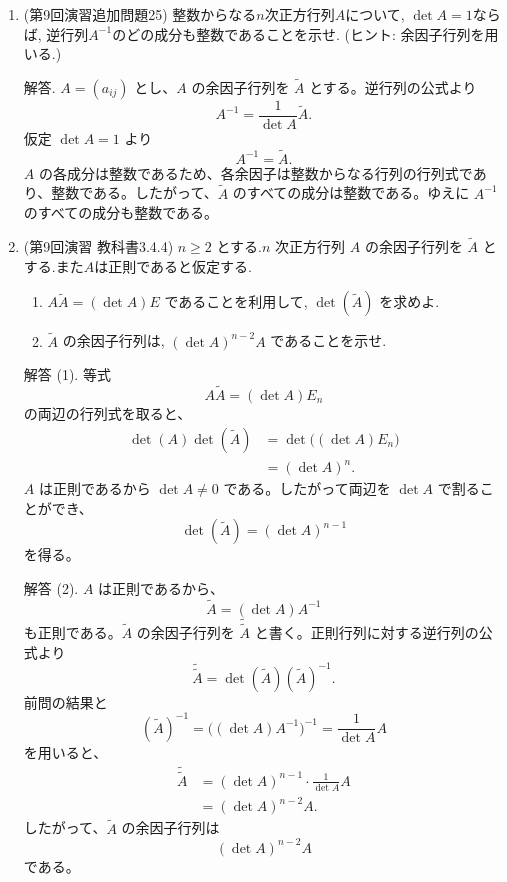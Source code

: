 \documentclass[dvipdfmx,a4paper,11pt]{article} %
\theoremstyle{definition}
\begin{document}
\begin{enumerate}[label=\textbf{問題}\arabic*.]
$n=1$ のとき、
\[
D_1(a_0,a_1)
=\begin{vmatrix}a_0&-1\\a_1&x\end{vmatrix}
=a_0x+a_1
\]
であり、主張は成り立つ。

帰納法の仮定として
\[
D_{n-1}(a_1,\ldots,a_n)
=a_1x^{n-1}+a_2x^{n-2}+\cdots+a_{n-1}x+a_n
\]
とする。このとき
\begin{align*}
D_n(a_0,\ldots,a_n)
&=a_0x^n+D_{n-1}(a_1,\ldots,a_n)\\
&=a_0x^n+a_1x^{n-1}+\cdots+a_{n-1}x+a_n.
\end{align*}
よって数学的帰納法により
\[
\boxed{
D_n(a_0,\ldots,a_n)
=a_0x^n+a_1x^{n-1}+\cdots+a_{n-1}x+a_n}
\]
が成り立つ。

 \item (第9回演習追加問題25)  整数からなる$n$次正方行列$A$について, $\det A=1$ならば, 逆行列$A^{-1}$のどの成分も整数であることを示せ. (ヒント: 余因子行列を用いる.)

解答. $A=(a_{ij})$ とし、$A$ の余因子行列を $\widetilde A$ とする。逆行列の公式より
\[
A^{-1}=\frac{1}{\det A}\widetilde A.
\]
仮定 $\det A=1$ より
\[
A^{-1}=\widetilde A.
\]
$A$ の各成分は整数であるため、各余因子は整数からなる行列の行列式であり、整数である。したがって、$\widetilde A$ のすべての成分は整数である。ゆえに $A^{-1}$ のすべての成分も整数である。

\item (第9回演習 教科書3.4.4) $n\geq 2$ とする.$n$ 次正方行列 $A$ の余因子行列を $\widetilde A$ とする.また$A$は正則であると仮定する. 
 \begin{enumerate}[label=(\arabic*)]
\item
\(
A\widetilde A=(\det A)E
\)
であることを利用して, 
\(
\det (\widetilde A)
\)
を求めよ.

\item $\widetilde A$ の余因子行列は, 
\(
(\det A)^{n-2}A
\)
であることを示せ.
\end{enumerate}

解答 (1). 
等式
\[
A\widetilde A=(\det A)E_n
\]
の両辺の行列式を取ると、
\begin{align*}
\det(A)\det(\widetilde A)
&=\det\bigl((\det A)E_n\bigr)\\
&=(\det A)^n.
\end{align*}
$A$ は正則であるから $\det A\neq0$ である。したがって両辺を $\det A$ で割ることができ、
\[
\boxed{\det(\widetilde A)=(\det A)^{n-1}}
\]
を得る。

解答 (2). 
$A$ は正則であるから、
\[
\widetilde A=(\det A)A^{-1}
\]
も正則である。$\widetilde A$ の余因子行列を $\widetilde{\widetilde A}$ と書く。正則行列に対する逆行列の公式より
\[
\widetilde{\widetilde A}
=\det(\widetilde A)(\widetilde A)^{-1}.
\]
前問の結果と
\[
(\widetilde A)^{-1}
=\bigl((\det A)A^{-1}\bigr)^{-1}
=\frac{1}{\det A}A
\]
を用いると、
\begin{align*}
\widetilde{\widetilde A}
&=(\det A)^{n-1}\cdot\frac{1}{\det A}A\\
&=(\det A)^{n-2}A.
\end{align*}
したがって、$\widetilde A$ の余因子行列は
\[
\boxed{(\det A)^{n-2}A}
\]
である。



\end{enumerate}
\end{document}
